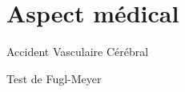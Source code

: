\section{Aspect médical}

\begin{frame}
\end{frame}

\begin{frame}{Accident Vasculaire Cérébral}
\end{frame}

\begin{frame}{Test de Fugl-Meyer}
\end{frame}